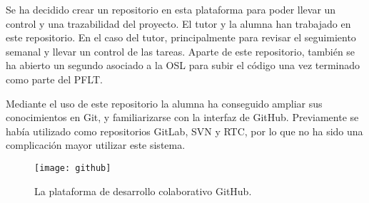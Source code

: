 Se ha decidido crear un repositorio en esta plataforma para poder llevar un control y una trazabilidad del proyecto. El tutor y la alumna han trabajado en este repositorio. En el caso del tutor, principalmente para revisar el seguimiento semanal y llevar un control de las tareas. Aparte de este repositorio, también se ha abierto un segundo asociado a la OSL para subir el código una vez terminado como parte del PFLT.


Mediante el uso de este repositorio la alumna ha conseguido ampliar sus conocimientos en Git, y familiarizarse con la interfaz de GitHub. Previamente se había utilizado como repositorios GitLab, SVN y RTC, por lo que no ha sido una complicación mayor utilizar este sistema.


\begin{figure}[h]
	\centering
	\texttt{[image: github]}
	\caption{La plataforma de desarrollo colaborativo GitHub.}
	\label{fig:github}
\end{figure}